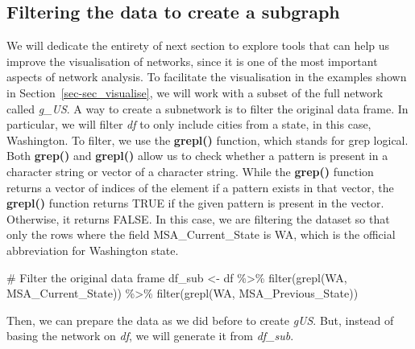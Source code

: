 \documentclass[
  letterpaper,
  DIV=11,
  numbers=noendperiod]{scrreprt}
\newenvironment{Shaded}{\begin{snugshade}}{\end{snugshade}}
\newcommand{\CommentTok}[1]{\textcolor[rgb]{0.37,0.37,0.37}{#1}}
\newcommand{\FunctionTok}[1]{\textcolor[rgb]{0.28,0.35,0.67}{#1}}
\newcommand{\NormalTok}[1]{\textcolor[rgb]{0.00,0.23,0.31}{#1}}
\newcommand{\OtherTok}[1]{\textcolor[rgb]{0.00,0.23,0.31}{#1}}
\newcommand{\SpecialCharTok}[1]{\textcolor[rgb]{0.37,0.37,0.37}{#1}}
\newcommand{\StringTok}[1]{\textcolor[rgb]{0.13,0.47,0.30}{#1}}
\begin{document}
\hypertarget{filtering-the-data-to-create-a-subgraph}{%
\subsection{Filtering the data to create a
subgraph}\label{filtering-the-data-to-create-a-subgraph}}

We will dedicate the entirety of next section to explore tools that can
help us improve the visualisation of networks, since it is one of the
most important aspects of network analysis. To facilitate the
visualisation in the examples shown in Section~\ref{sec-sec_visualise},
we will work with a subset of the full network called \emph{g\_US}. A
way to create a subnetwork is to filter the original data frame. In
particular, we will filter \emph{df} to only include cities from a
state, in this case, Washington. To filter, we use the \textbf{grepl()}
function, which stands for grep logical. Both \textbf{grep()} and
\textbf{grepl()} allow us to check whether a pattern is present in a
character string or vector of a character string. While the
\textbf{grep()} function returns a vector of indices of the element if a
pattern exists in that vector, the \textbf{grepl()} function returns
TRUE if the given pattern is present in the vector. Otherwise, it
returns FALSE. In this case, we are filtering the dataset so that only
the rows where the field MSA\_Current\_State is WA, which is the
official abbreviation for Washington state.

\begin{Shaded}
\begin{Highlighting}[]
\CommentTok{\# Filter the original data frame}
\NormalTok{df\_sub }\OtherTok{\textless{}{-}}\NormalTok{ df }\SpecialCharTok{\%\textgreater{}\%} \FunctionTok{filter}\NormalTok{(}\FunctionTok{grepl}\NormalTok{(}\StringTok{\textquotesingle{}WA\textquotesingle{}}\NormalTok{, MSA\_Current\_State)) }\SpecialCharTok{\%\textgreater{}\%} \FunctionTok{filter}\NormalTok{(}\FunctionTok{grepl}\NormalTok{(}\StringTok{\textquotesingle{}WA\textquotesingle{}}\NormalTok{, MSA\_Previous\_State)) }
\end{Highlighting}
\end{Shaded}

Then, we can prepare the data as we did before to create \emph{gUS}.
But, instead of basing the network on \emph{df}, we will generate it
from \emph{df\_sub}.
\end{document}

